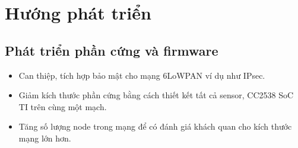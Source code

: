 \documentclass{report}
\begin{document}
\section{Hướng phát triển}
\subsection{Phát triển phần cứng và firmware}
\begin{itemize}
	\item Can thiệp, tích hợp bảo mật cho mạng 6LoWPAN ví dụ như IPsec.
	\item Giảm kích thước phần cứng bằng cách thiết kết tất cả sensor, CC2538 SoC TI trên
	cùng một mạch.
	\item Tăng số lượng node trong mạng để có đánh giá khách quan cho kích thước mạng lớn hơn.
\end{itemize}
\end{document}
